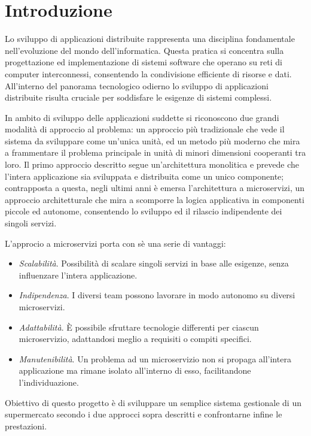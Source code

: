\chapter{Introduzione}

	Lo sviluppo di applicazioni distribuite rappresenta una disciplina fondamentale nell'evoluzione del mondo dell'informatica.
	Questa pratica si concentra sulla progettazione ed implementazione di sistemi software che operano su reti di computer interconnessi, consentendo la condivisione efficiente di risorse e dati.
	All'interno del panorama tecnologico odierno lo sviluppo di applicazioni distribuite risulta cruciale per soddisfare le esigenze di sistemi complessi.
	
	In ambito di sviluppo delle applicazioni suddette si riconoscono due grandi modalità di approccio al problema: un approccio più tradizionale che vede il sistema da sviluppare come un'unica unità, ed un metodo più moderno che mira a frammentare il problema principale in unità di minori dimensioni cooperanti tra loro.
	Il primo approccio descritto segue un'architettura monolitica e prevede che l'intera applicazione sia sviluppata e distribuita come un unico componente;
	contrapposta a questa, negli ultimi anni è emersa l'architettura a microservizi, un approccio architetturale che mira a scomporre la logica applicativa in componenti piccole ed autonome, consentendo lo sviluppo ed il rilascio indipendente dei singoli servizi\cite{doc:kube}.
	
	L'approcio a microservizi porta con sè una serie di vantaggi:
	
	\begin{itemize}
		\item \emph{Scalabilità}. Possibilità di scalare singoli servizi in base alle esigenze, senza influenzare l'intera applicazione.
		\item \emph{Indipendenza}. I diversi team possono lavorare in modo autonomo su diversi microservizi.
		\item \emph{Adattabilità}. \`E possibile sfruttare tecnologie differenti per ciascun microservizio, adattandosi meglio a requisiti o compiti specifici.
		\item \emph{Manutenibilità}. Un problema ad un microservizio non si propaga all'intera applicazione ma rimane isolato all'interno di esso, facilitandone l'individuazione.		
	\end{itemize}
	
	Obiettivo di questo progetto è di sviluppare un semplice sistema gestionale di un supermercato secondo i due approcci sopra descritti e confrontarne infine le prestazioni.
	
